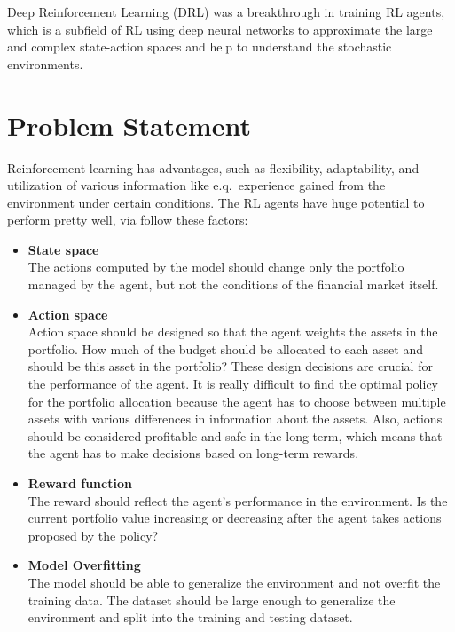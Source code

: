 Deep Reinforcement Learning (DRL) was a breakthrough in training RL agents, which is a subfield of RL using deep neural networks to approximate the large and complex state-action spaces and help to understand the stochastic environments\cite{ai4finance-Optimistic-Bull-or-Pessimistic-Bear}.


\section{Problem Statement}\label{sec:problem-statement}
Reinforcement learning has advantages, such as flexibility, adaptability, and utilization of various information like e.q.\ experience gained from the environment under certain conditions.
The RL agents have huge potential to perform pretty well, via follow these factors:

\begin{itemize}
    \item \textbf{State space}\\
    The actions computed by the model should change only the portfolio managed by the agent, but not the conditions of the financial market itself.
    \item \textbf{Action space} \\
    Action space should be designed so that the agent weights the assets in the portfolio.
    How much of the budget should be allocated to each asset and should be this asset in the portfolio?
    These design decisions are crucial for the performance of the agent.
    It is really difficult to find the optimal policy for the portfolio allocation because the agent has to choose between multiple assets with various differences in information about the assets.
    Also, actions should be considered profitable and safe in the long term, which means that the agent has to make decisions based on long-term rewards.
    \item \textbf{Reward function}\\
    The reward should reflect the agent's performance in the environment.
    Is the current portfolio value increasing or decreasing after the agent takes actions proposed by the policy?
    \item \textbf{Model Overfitting}\\
    The model should be able to generalize the environment and not overfit the training data.
    The dataset should be large enough to generalize the environment and split into the training and testing dataset.
\end{itemize}


